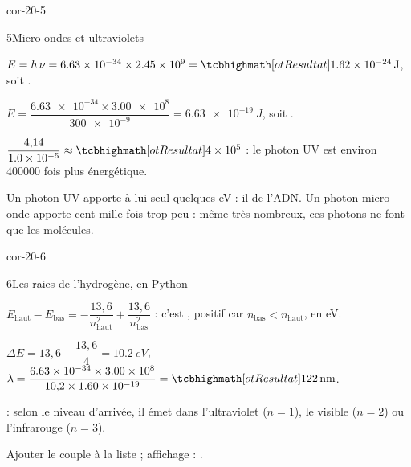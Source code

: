 \begin{blocLivre}{cor-20-5}
\begin{corrige}{5}{Micro-ondes et ultraviolets}
\begin{questions}
\item $E=h\,\nu=\num{6,63e-34}\times\num{2,45e9}=\res{\qty{1,62e-24}{J}}$, soit .
\item $E=\dfrac{\num{6,63e-34}\times\num{3,00e8}}{\num{300e-9}}=\qty{6,63e-19}{J}$, soit .
\item $\dfrac{4{,}14}{\num{1,0e-5}}\approx\res{\num{4e5}}$ : le photon UV est environ \num{400000} fois plus énergétique.
\item Un photon UV apporte à lui seul quelques eV : il  de l'ADN. Un photon micro-onde apporte cent mille fois
trop peu : même très nombreux, ces photons ne font que  les molécules.
\end{questions}
\end{corrige}
\end{blocLivre}
\begin{blocLivre}{cor-20-6}
\begin{corrige}{6}{Les raies de l'hydrogène, en Python}
\begin{questions}
\item $E_\text{haut}-E_\text{bas}=-\dfrac{13{,}6}{n_\text{haut}^2}+\dfrac{13{,}6}{n_\text{bas}^2}$ : c'est , positif car $n_\text{bas}<n_\text{haut}$, en eV.
\item $\Delta E=13{,}6-\dfrac{13{,}6}{4}=\qty{10,2}{eV}$, $\lambda=\dfrac{\num{6,63e-34}\times\num{3,00e8}}{10{,}2\times\num{1,60e-19}}=\res{\qty{122}{nm}}$.
\item {} : selon le niveau d'arrivée, il émet dans l'ultraviolet ($n=1$), le visible ($n=2$) ou l'infrarouge ($n=3$).
\item Ajouter le couple  à la liste ; affichage : .
\end{questions}
\end{corrige}
\end{blocLivre}
